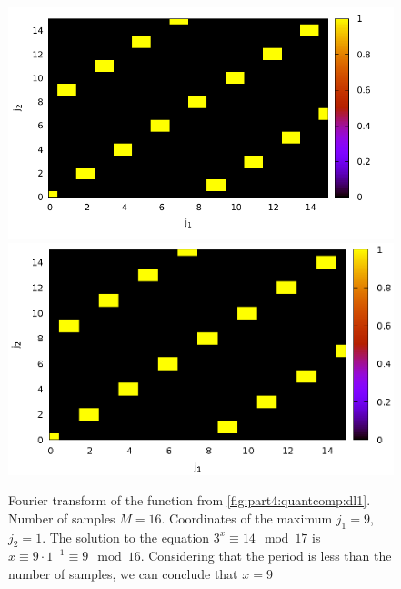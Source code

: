 \begin{figure}
\centering

\ifpdf
\includegraphics[angle=0]
{./part4/quantcomp/picdiscretlog2.pdf}
\else
\includegraphics[angle=0]
{./part4/quantcomp/picdiscretlog2.eps}
\fi

%

\caption{Fourier transform of the function from \autoref{fig:part4:quantcomp:dl1}.
  Number of samples $M=16$. Coordinates of the maximum $j_1 = 9$, $j_2 = 1$.
The solution to the equation $3^x \equiv 14 \mod 17$
is $x \equiv 9 \cdot 1^{-1} \equiv 9 \mod 16$. Considering that
the period is less than the number of samples, we can conclude that $x = 9$} 
\label{fig:part4:quantcomp:dl2}
\end{figure}